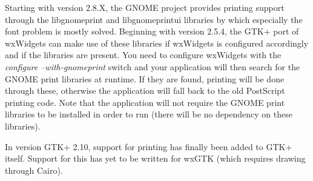Starting with version 2.8.X, the GNOME project provides printing
support through the libgnomeprint and libgnomeprintui libraries
by which especially the font problem is mostly solved. Beginning
with version 2.5.4, the GTK+ port of wxWidgets can make use of
these libraries if wxWidgets is configured accordingly and if the
libraries are present. You need to configure wxWidgets with the
{\it configure --with-gnomeprint} switch and your application will
then search for the GNOME print libraries at runtime. If they
are found, printing will be done through these, otherwise the
application will fall back to the old PostScript printing code.
Note that the application will not require the GNOME print libraries
to be installed in order to run (there will be no dependency on
these libraries).

In version GTK+ 2.10, support for printing has finally been
added to GTK+ itself. Support for this has yet to be written
for wxGTK (which requires drawing through Cairo).

